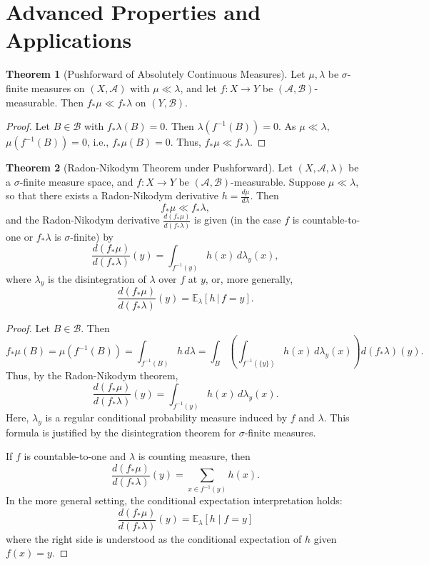 \documentclass[12pt]{article}
\theoremstyle{definition}
\newtheorem{theorem}{Theorem}[section]
\begin{document}
\section{Advanced Properties and Applications}

\begin{theorem}[Pushforward of Absolutely Continuous Measures]
Let $\mu, \lambda$ be $\sigma$-finite measures on $(X, \mathscr{A})$ with $\mu \ll \lambda$, and let $f: X \to Y$ be $(\mathscr{A}, \mathscr{B})$-measurable. Then $f_{*}\mu \ll f_{*}\lambda$ on $(Y, \mathscr{B})$.
\end{theorem}

\begin{proof}
Let $B \in \mathscr{B}$ with $f_{*}\lambda (B) = 0$. Then $\lambda( f^{-1}(B) ) = 0$. As $\mu \ll \lambda$, $\mu( f^{-1}(B) ) = 0$, i.e., $f_{*}\mu (B) = 0$. Thus, $f_{*}\mu \ll f_{*}\lambda$.
\end{proof}

\begin{theorem}[Radon-Nikodym Theorem under Pushforward]
Let $(X, \mathscr{A}, \lambda)$ be a $\sigma$-finite measure space, and $f: X \to Y$ be $(\mathscr{A}, \mathscr{B})$-measurable. Suppose $\mu \ll \lambda$, so that there exists a Radon-Nikodym derivative $h = \frac{d\mu}{d\lambda}$. Then 
\[
f_{*}\mu \ll f_{*}\lambda,
\]
and the Radon-Nikodym derivative $\frac{d(f_{*}\mu)}{d(f_{*}\lambda)}$ is given (in the case $f$ is countable-to-one or $f_{*}\lambda$ is $\sigma$-finite) by
\[
\frac{d(f_{*}\mu)}{d(f_{*}\lambda)}(y) = \int_{f^{-1}(y)} h(x)\, d\lambda_y(x),
\]
where $\lambda_y$ is the disintegration of $\lambda$ over $f$ at $y$, or, more generally,
\[
\frac{d(f_{*}\mu)}{d(f_{*}\lambda)}(y) = \mathbb{E}_{\lambda}[ h \, | \, f = y ].
\]
\end{theorem}

\begin{proof}
Let $B \in \mathscr{B}$. Then
\[
f_{*}\mu(B) = \mu( f^{-1}(B) ) = \int_{f^{-1}(B)} h \, d\lambda = \int_{B} \left( \int_{f^{-1}(\{y\})} h(x)\, d\lambda_y(x) \right ) d(f_{*}\lambda)(y).
\]
Thus, by the Radon-Nikodym theorem,
\[
\frac{d(f_{*}\mu)}{d(f_{*}\lambda)}(y) = \int_{f^{-1}(y)} h(x)\, d\lambda_y(x).
\]
Here, $\lambda_y$ is a regular conditional probability measure induced by $f$ and $\lambda$. This formula is justified by the disintegration theorem for $\sigma$-finite measures.

If $f$ is countable-to-one and $\lambda$ is counting measure, then
\[
\frac{d(f_{*}\mu)}{d(f_{*}\lambda)}(y) = \sum_{x \in f^{-1}(y)} h(x).
\]
In the more general setting, the conditional expectation interpretation holds:
\[
\frac{d(f_{*}\mu)}{d(f_{*}\lambda)} (y) = \mathbb{E}_\lambda[ h \mid f = y ]
\]
where the right side is understood as the conditional expectation of $h$ given $f(x) = y$.
\end{proof}
\end{document}
